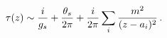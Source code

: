 \begin{equation}
\tau(z)\sim {i\over g_s} + \frac{\theta_{s}}{2\pi} + 
{i\over 2\pi }\sum_i {m^2\over
(z-a_i)^2 }\,.\label{taud}
\end{equation}

